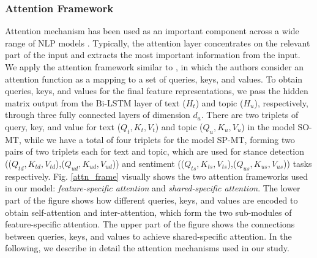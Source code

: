 \documentclass[letterpaper]{article} %
\begin{document}
\subsubsection{Attention Framework} \label{attn_section}
Attention mechanism has been used as an important component across a wide range of NLP models \cite{bahdanau2014neural}. Typically, the attention layer concentrates on the relevant part of the input and extracts the most important information from the input. We apply the attention framework similar to \cite{vaswani2017attention}, in which the authors consider an attention function as a mapping to a set of queries, keys, and values. To obtain queries, keys, and values for the final feature representations, we pass the hidden matrix output from the Bi-LSTM layer of text ($H_t$) and topic ($H_u$), respectively, through three fully connected layers of dimension $d_a$. There are two triplets of query, key, and value for text ($Q_t,K_t,V_t$) and topic ($Q_u,K_u,V_u$) in the model SO-MT, while we have a total of four triplets for the model SP-MT, forming two pairs of two triplets each for text and topic, which are used for stance detection (($Q_{td},K_{td},V_{td}$),($Q_{ud},K_{ud},V_{ud}$)) and sentiment (($Q_{ts},K_{ts},V_{ts}$),($Q_{us},K_{us},V_{us}$)) tasks respectively. Fig. \ref{attn_frame} visually shows the two attention frameworks used in our model: \textit{feature-specific attention} and \textit{shared-specific attention}. The lower part of the figure shows how different queries, keys, and values are encoded to obtain self-attention and inter-attention, which form the two sub-modules of feature-specific attention. The upper part of the figure shows the connections between queries, keys, and values to achieve shared-specific attention. In the following, we describe in detail the attention mechanisms used in our study.
\end{document}
